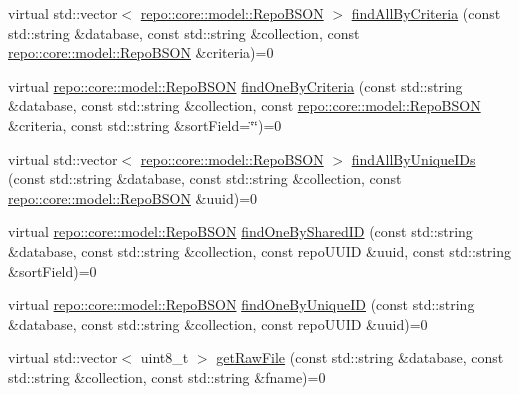 \begin{DoxyCompactItemize}
\item 
virtual std\+::vector$<$ \hyperlink{classrepo_1_1core_1_1model_1_1_repo_b_s_o_n}{repo\+::core\+::model\+::\+Repo\+B\+S\+O\+N} $>$ \hyperlink{classrepo_1_1core_1_1handler_1_1_abstract_database_handler_ad964d9c80fcddf1444edcf7021c81e50}{find\+All\+By\+Criteria} (const std\+::string \&database, const std\+::string \&collection, const \hyperlink{classrepo_1_1core_1_1model_1_1_repo_b_s_o_n}{repo\+::core\+::model\+::\+Repo\+B\+S\+O\+N} \&criteria)=0
\item 
virtual \hyperlink{classrepo_1_1core_1_1model_1_1_repo_b_s_o_n}{repo\+::core\+::model\+::\+Repo\+B\+S\+O\+N} \hyperlink{classrepo_1_1core_1_1handler_1_1_abstract_database_handler_a321cc0160469e94b12fa5fe800c6c1c5}{find\+One\+By\+Criteria} (const std\+::string \&database, const std\+::string \&collection, const \hyperlink{classrepo_1_1core_1_1model_1_1_repo_b_s_o_n}{repo\+::core\+::model\+::\+Repo\+B\+S\+O\+N} \&criteria, const std\+::string \&sort\+Field=\char`\"{}\char`\"{})=0
\item 
virtual std\+::vector$<$ \hyperlink{classrepo_1_1core_1_1model_1_1_repo_b_s_o_n}{repo\+::core\+::model\+::\+Repo\+B\+S\+O\+N} $>$ \hyperlink{classrepo_1_1core_1_1handler_1_1_abstract_database_handler_ad62823283064682c08acd1bd6f1414f8}{find\+All\+By\+Unique\+I\+Ds} (const std\+::string \&database, const std\+::string \&collection, const \hyperlink{classrepo_1_1core_1_1model_1_1_repo_b_s_o_n}{repo\+::core\+::model\+::\+Repo\+B\+S\+O\+N} \&uuid)=0
\item 
virtual \hyperlink{classrepo_1_1core_1_1model_1_1_repo_b_s_o_n}{repo\+::core\+::model\+::\+Repo\+B\+S\+O\+N} \hyperlink{classrepo_1_1core_1_1handler_1_1_abstract_database_handler_ab83477a74036a6e608620ab53b67df58}{find\+One\+By\+Shared\+I\+D} (const std\+::string \&database, const std\+::string \&collection, const repo\+U\+U\+I\+D \&uuid, const std\+::string \&sort\+Field)=0
\item 
virtual \hyperlink{classrepo_1_1core_1_1model_1_1_repo_b_s_o_n}{repo\+::core\+::model\+::\+Repo\+B\+S\+O\+N} \hyperlink{classrepo_1_1core_1_1handler_1_1_abstract_database_handler_af6cae49e44df081b5895cbf7b7ff6652}{find\+One\+By\+Unique\+I\+D} (const std\+::string \&database, const std\+::string \&collection, const repo\+U\+U\+I\+D \&uuid)=0
\item 
virtual std\+::vector$<$ uint8\+\_\+t $>$ \hyperlink{classrepo_1_1core_1_1handler_1_1_abstract_database_handler_af3d3e2d5d3013ab51675247b202ed488}{get\+Raw\+File} (const std\+::string \&database, const std\+::string \&collection, const std\+::string \&fname)=0
\end{DoxyCompactItemize}
